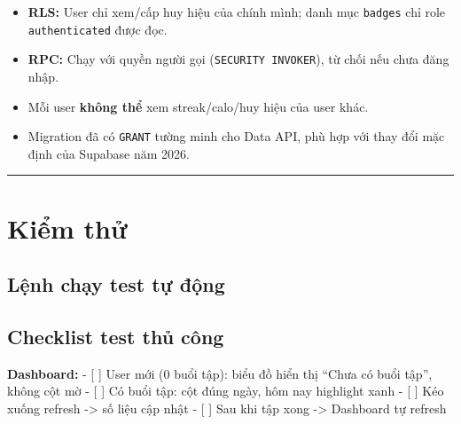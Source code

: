\documentclass[12pt,a4paper]{article}
\newenvironment{Shaded}{%
  \VerbatimEnvironment
  \begin{quote}\small\ttfamily
}{%
  \end{quote}%
}
\providecommand{\tightlist}{%
  \setlength{\itemsep}{0pt}\setlength{\parskip}{0pt}}
\begin{document}
\begin{itemize}
\tightlist
\item
  \textbf{RLS:} User chỉ xem/cấp huy hiệu của chính mình; danh mục
  \texttt{badges} chỉ role \texttt{authenticated} được đọc.
\item
  \textbf{RPC:} Chạy với quyền người gọi (\texttt{SECURITY\ INVOKER}),
  từ chối nếu chưa đăng nhập.
\item
  Mỗi user \textbf{không thể} xem streak/calo/huy hiệu của user khác.
\item
  Migration đã có \texttt{GRANT} tường minh cho Data API, phù hợp với
  thay đổi mặc định của Supabase năm 2026.
\end{itemize}

\begin{center}\rule{0.5\linewidth}{0.5pt}\end{center}

\section{Kiểm thử}\label{kiux1ec3m-thux1eed}

\subsection{Lệnh chạy test tự
động}\label{lux1ec7nh-chux1ea1y-test-tux1ef1-ux111ux1ed9ng}

\begin{Shaded}
\begin{Highlighting}[]

\end{Highlighting}
\end{Shaded}

\subsection{Checklist test thủ
công}\label{checklist-test-thux1ee7-cuxf4ng}

\textbf{Dashboard:} - {[} {]} User mới (0 buổi tập): biểu đồ hiển thị
``Chưa có buổi tập'', không cột mờ - {[} {]} Có buổi tập: cột đúng ngày,
hôm nay highlight xanh - {[} {]} Kéo xuống refresh -\textgreater{} số
liệu cập nhật - {[} {]} Sau khi tập xong -\textgreater{} Dashboard tự
refresh
\end{document}
